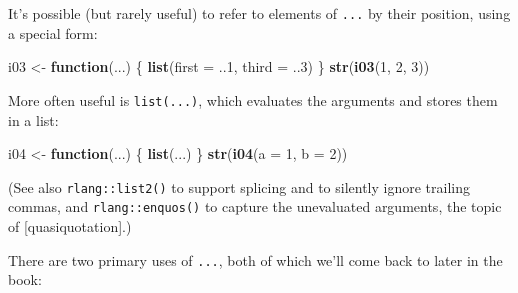 \documentclass[]{book}
\newenvironment{Shaded}{\begin{snugshade}}{\end{snugshade}}
\newcommand{\KeywordTok}[1]{\textcolor[rgb]{0.13,0.29,0.53}{\textbf{#1}}}
\newcommand{\DataTypeTok}[1]{\textcolor[rgb]{0.13,0.29,0.53}{#1}}
\newcommand{\DecValTok}[1]{\textcolor[rgb]{0.00,0.00,0.81}{#1}}
\newcommand{\StringTok}[1]{\textcolor[rgb]{0.31,0.60,0.02}{#1}}
\newcommand{\ControlFlowTok}[1]{\textcolor[rgb]{0.13,0.29,0.53}{\textbf{#1}}}
\newcommand{\NormalTok}[1]{#1}
\theoremstyle{definition}
\theoremstyle{definition}
\theoremstyle{definition}
\theoremstyle{remark}
\begin{document}
It's possible (but rarely useful) to refer to elements of \texttt{...}
by their position, using a special form:

\begin{Shaded}
\begin{Highlighting}[]
\NormalTok{i03 <-}\StringTok{ }\ControlFlowTok{function}\NormalTok{(...) \{}
  \KeywordTok{list}\NormalTok{(}\DataTypeTok{first =}\NormalTok{ ..}\DecValTok{1}\NormalTok{, }\DataTypeTok{third =}\NormalTok{ ..}\DecValTok{3}\NormalTok{)}
\NormalTok{\}}
\KeywordTok{str}\NormalTok{(}\KeywordTok{i03}\NormalTok{(}\DecValTok{1}\NormalTok{, }\DecValTok{2}\NormalTok{, }\DecValTok{3}\NormalTok{))}
\end{Highlighting}
\end{Shaded}

More often useful is \texttt{list(...)}, which evaluates the arguments
and stores them in a list:

\begin{Shaded}
\begin{Highlighting}[]
\NormalTok{i04 <-}\StringTok{ }\ControlFlowTok{function}\NormalTok{(...) \{}
  \KeywordTok{list}\NormalTok{(...)}
\NormalTok{\}}
\KeywordTok{str}\NormalTok{(}\KeywordTok{i04}\NormalTok{(}\DataTypeTok{a =} \DecValTok{1}\NormalTok{, }\DataTypeTok{b =} \DecValTok{2}\NormalTok{))}
\end{Highlighting}
\end{Shaded}

(See also \texttt{rlang::list2()} to support splicing and to silently
ignore trailing commas, and \texttt{rlang::enquos()} to capture the
unevaluated arguments, the topic of {[}quasiquotation{]}.)

There are two primary uses of \texttt{...}, both of which we'll come
back to later in the book:
\end{document}

